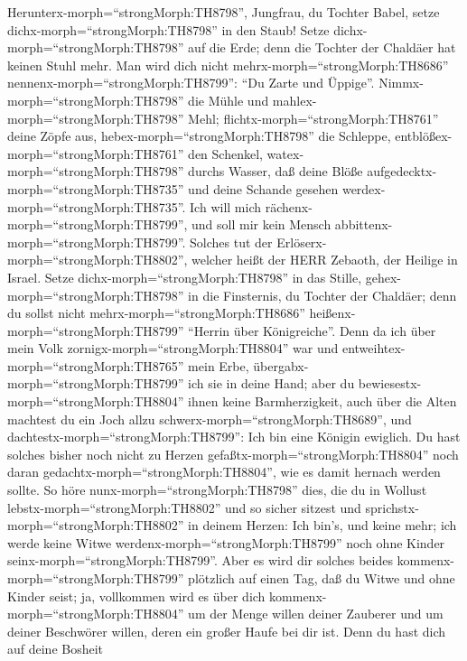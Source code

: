  Herunterx-morph=``strongMorph:TH8798'', Jungfrau, du
Tochter Babel, setze dichx-morph=``strongMorph:TH8798'' in den Staub!
Setze dichx-morph=``strongMorph:TH8798'' auf die Erde; denn die Tochter
der Chaldäer hat keinen Stuhl mehr. Man wird dich nicht
mehrx-morph=``strongMorph:TH8686'' nennenx-morph=``strongMorph:TH8799'':
``Du Zarte und Üppige''.  Nimmx-morph=``strongMorph:TH8798''
die Mühle und mahlex-morph=``strongMorph:TH8798'' Mehl;
flichtx-morph=``strongMorph:TH8761'' deine Zöpfe aus,
hebex-morph=``strongMorph:TH8798'' die Schleppe,
entblößex-morph=``strongMorph:TH8761'' den Schenkel,
watex-morph=``strongMorph:TH8798'' durchs Wasser,  daß deine
Blöße aufgedecktx-morph=``strongMorph:TH8735'' und deine Schande gesehen
werdex-morph=``strongMorph:TH8735''. Ich will mich
rächenx-morph=``strongMorph:TH8799'', und soll mir kein Mensch
abbittenx-morph=``strongMorph:TH8799''.  Solches tut der
Erlöserx-morph=``strongMorph:TH8802'', welcher heißt der HERR Zebaoth,
der Heilige in Israel.  Setze
dichx-morph=``strongMorph:TH8798'' in das Stille,
gehex-morph=``strongMorph:TH8798'' in die Finsternis, du Tochter der
Chaldäer; denn du sollst nicht mehrx-morph=``strongMorph:TH8686''
heißenx-morph=``strongMorph:TH8799'' ``Herrin über Königreiche''.
 Denn da ich über mein Volk
zornigx-morph=``strongMorph:TH8804'' war und
entweihtex-morph=``strongMorph:TH8765'' mein Erbe,
übergabx-morph=``strongMorph:TH8799'' ich sie in deine Hand; aber du
bewiesestx-morph=``strongMorph:TH8804'' ihnen keine Barmherzigkeit, auch
über die Alten machtest du ein Joch allzu
schwerx-morph=``strongMorph:TH8689'',  und
dachtestx-morph=``strongMorph:TH8799'': Ich bin eine Königin ewiglich.
Du hast solches bisher noch nicht zu Herzen
gefaßtx-morph=``strongMorph:TH8804'' noch daran
gedachtx-morph=``strongMorph:TH8804'', wie es damit hernach werden
sollte.  So höre nunx-morph=``strongMorph:TH8798'' dies, die
du in Wollust lebstx-morph=``strongMorph:TH8802'' und so sicher sitzest
und sprichstx-morph=``strongMorph:TH8802'' in deinem Herzen: Ich bin's,
und keine mehr; ich werde keine Witwe
werdenx-morph=``strongMorph:TH8799'' noch ohne Kinder
seinx-morph=``strongMorph:TH8799''.  Aber es wird dir
solches beides kommenx-morph=``strongMorph:TH8799'' plötzlich auf einen
Tag, daß du Witwe und ohne Kinder seist; ja, vollkommen wird es über
dich kommenx-morph=``strongMorph:TH8804'' um der Menge willen deiner
Zauberer und um deiner Beschwörer willen, deren ein großer Haufe bei dir
ist.  Denn du hast dich auf deine Bosheit
